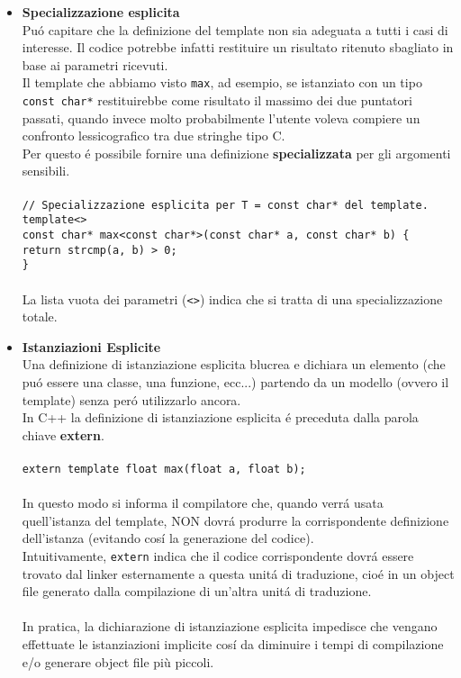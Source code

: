 \documentclass{article}
\newcommand\tab[1][1cm]{\hspace*{#1}}
\begin{document}
\begin{itemize}
\item \textbf{\textcolor{blu}{Specializzazione esplicita}}\\ Pu\'o capitare che la definizione del template non sia adeguata a tutti i casi di interesse. Il codice potrebbe infatti restituire un risultato ritenuto sbagliato in base ai parametri ricevuti. \\ Il template che abbiamo visto \texttt{max}, ad esempio, se istanziato con un tipo \texttt{const char*} restituirebbe come risultato il massimo dei due puntatori passati, quando invece molto probabilmente l'utente voleva compiere un confronto lessicografico tra due stringhe tipo C.\\Per questo \'e possibile fornire una definizione \textbf{specializzata} per gli argomenti sensibili. \\ \\
\texttt{\textcolor{grigio}{// Specializzazione esplicita per T = const char* del template.} \\ template<>\\const char* max<const char*>(const char* a, const char* b) \{ \\ \tab return strcmp(a, b) > 0; \\ \}} \\ \\ La lista vuota dei parametri (\texttt{<>}) indica che si tratta di una specializzazione totale. \\
\item \textbf{\textcolor{blu}{Istanziazioni Esplicite}}\\Una definizione di istanziazione esplicita blucrea e dichiara un elemento (che pu\'o essere una classe, una funzione, ecc...) partendo da un modello (ovvero il template) senza per\'o utilizzarlo ancora.\\In C++ la definizione di istanziazione esplicita \'e preceduta dalla parola chiave \textbf{extern}.\\ \\
\texttt{extern template float max(float a, float b); } \\ \\In questo modo si informa il compilatore che, quando verr\'a usata quell'istanza del template, NON dovr\'a produrre la corrispondente definizione dell'istanza (evitando cos\'i la generazione del codice).\\Intuitivamente, \texttt{extern} indica che il codice corrispondente dovr\'a essere trovato dal linker esternamente a questa unit\'a di traduzione, cio\'e in un object file generato dalla compilazione di un'altra unit\'a di traduzione.\\ \\In pratica, la dichiarazione di istanziazione esplicita impedisce che vengano effettuate le istanziazioni implicite cos\'i da diminuire i tempi di compilazione e/o generare object file più piccoli. \\ \\ \\ \\ 
\end{itemize}
\end{document}

